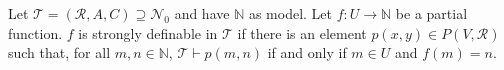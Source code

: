 Let $\mathcal{T} = (\mathcal{R}, A, C) \supseteq \mathcal{N}_0$ and have $\mathbb{N}$ as model. Let $f: U \to \mathbb{N}$ be a partial function. $f$ is strongly definable in $\mathcal{T}$ if there is an element $p(x, y) \in P(V, \mathcal{R})$ such that, for all $m, n \in \mathbb{N}$, $\mathcal{T} \vdash p(m, n)$ if and only if $m \in U$ and $f(m) = n$.
